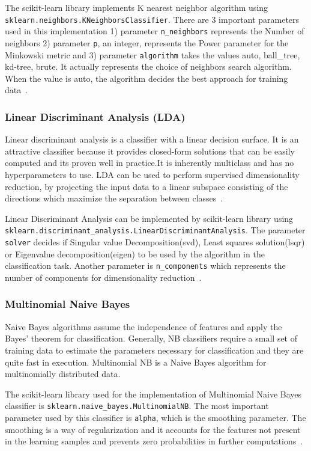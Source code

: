 \documentclass[letterpaper,10pt]{article}
\theoremstyle{mytheor}
\begin{document}
The scikit-learn library implements K nearest neighbor algorithm using \lstinline|sklearn.neighbors.KNeighborsClassifier|. There are 3 important parameters used in this implementation 1) parameter \lstinline|n_neighbors| represents the Number of neighbors  2) parameter \lstinline|p|, an integer, represents the Power parameter for the Minkowski metric and 3) parameter \lstinline|algorithm| takes the values auto, ball\_tree, kd-tree, brute. It actually represents the choice of neighbors search algorithm. When the value is auto, the algorithm decides the best approach for training data~\cite{scikit-learn}.

\subsubsection{Linear Discriminant Analysis (LDA)}
Linear discriminant analysis is a classifier with a linear decision surface. It is an attractive classifier because it provides closed-form solutions that can be easily computed and its proven well in practice.It is inherently multiclass and has no hyperparameters to use. LDA can be used to perform supervised dimensionality reduction, by projecting the input data to a linear subspace consisting of the directions which maximize the separation between classes~\cite{ldasklearn}.

Linear Discriminant Analysis can be implemented by scikit-learn library using \lstinline|sklearn.discriminant_analysis.LinearDiscriminantAnalysis|. The parameter \lstinline|solver| decides if Singular value Decomposition(svd), Least squares solution(lsqr) or Eigenvalue decomposition(eigen) to be used by the algorithm in the classification task. Another parameter is \lstinline|n_components| which represents the number of components for dimensionality reduction~\cite{scikit-learn}.

\subsubsection{Multinomial Naive Bayes}
Naive Bayes algorithms assume the independence of features and apply the Bayes’ theorem for classification. Generally, NB classifiers require a small set of training data to estimate the parameters necessary for classification and they are quite fast in execution. Multinomial NB is a Naive Bayes algorithm for multinomially distributed data.

The scikit-learn library used for the implementation of Multinomial Naive Bayes classifier is \lstinline|sklearn.naive_bayes.MultinomialNB|. The most important parameter used by this classifier is \lstinline|alpha|, which is the smoothing parameter. The smoothing is a way of regularization and it accounts for the features not present in the learning samples and prevents zero probabilities in further computations~\cite{scikit-learn}.
\end{document}
